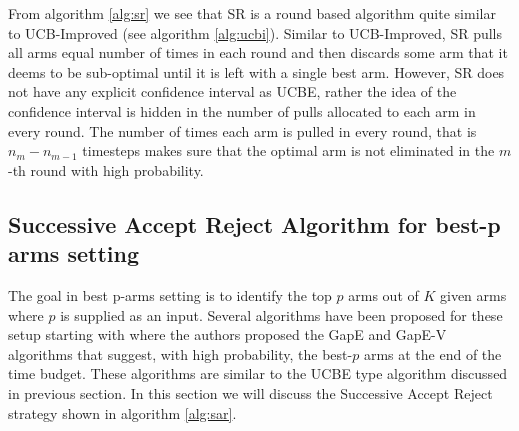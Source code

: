 From algorithm \ref{alg:sr} we see that SR is a round based algorithm quite similar to UCB-Improved (see algorithm \ref{alg:ucbi}). Similar to UCB-Improved, SR pulls all arms equal number of times in each round and then discards some arm that it deems to be sub-optimal until it is left with a single best arm. However, SR does not have any explicit confidence interval as UCBE, rather the idea of the confidence interval is hidden in the number of pulls allocated to each arm in every round. The number of times each arm is pulled in every round, that is $n_m - n_{m-1}$ timesteps makes sure that the optimal arm is not eliminated in the $m$-th round with high probability. 


\subsection{Successive Accept Reject Algorithm for best-p arms setting}

The goal in best p-arms setting is to identify the top $p$ arms out of $K$ given arms where $p$ is supplied as an input. Several algorithms have been proposed for these setup starting with \citet{gabillon2011multi} where the authors proposed the GapE and GapE-V algorithms that suggest, with high probability, the best-$p$ arms at the end of the time budget. These algorithms are similar to the UCBE type algorithm discussed in previous section. In this section we will discuss the Successive Accept Reject strategy shown in algorithm \ref{alg:sar}.


